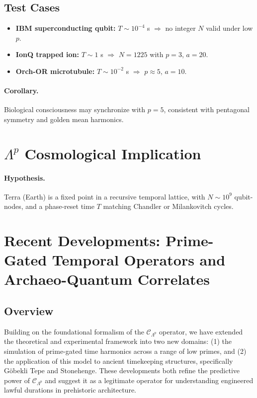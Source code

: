 \documentclass[12]{amsart}
\theoremstyle{plain}
\begin{document}
\subsection{Test Cases}

\begin{itemize}
  \item \textbf{IBM superconducting qubit:} $T \sim 10^{-4}$ s $\Rightarrow$ no integer $N$ valid under low $p$.
  \item \textbf{IonQ trapped ion:} $T \sim 1$ s $\Rightarrow$ $N = 1225$ with $p=3$, $a=20$.
  \item \textbf{Orch-OR microtubule:} $T \sim 10^{-2}$ s $\Rightarrow$ $p \approx 5$, $a=10$.
\end{itemize}

\paragraph{Corollary.} Biological consciousness may synchronize with $p=5$, consistent with pentagonal symmetry and golden mean harmonics.

\section{$\Lambda^p$ Cosmological Implication}

\paragraph{Hypothesis.} Terra (Earth) is a fixed point in a recursive temporal lattice, with $N \sim 10^9$ qubit-nodes, and a phase-reset time $T$ matching Chandler or Milankovitch cycles.

\section{Recent Developments: Prime-Gated Temporal Operators and Archaeo-Quantum Correlates}

\subsection{Overview}

Building on the foundational formalism of the $\mathcal{C}_{\Lambda^p}$ operator, we have extended the theoretical and experimental framework into two new domains: (1) the simulation of prime-gated time harmonics across a range of low primes, and (2) the application of this model to ancient timekeeping structures, specifically Göbekli Tepe and Stonehenge. These developments both refine the predictive power of $\mathcal{C}_{\Lambda^p}$ and suggest it as a legitimate operator for understanding engineered lawful durations in prehistoric architecture.
\end{document}
